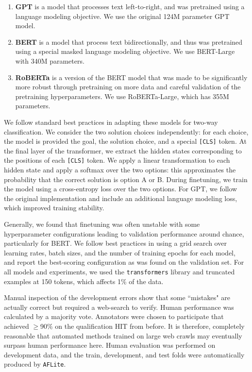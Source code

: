 \begin{enumerate}[wide, labelwidth=!,labelindent=0pt,noitemsep,topsep=0pt,label=\textbf{\alph*}.]
    \item {\bf GPT} \cite{Radford2018} is a model that processes text left-to-right, and was pretrained using a language modeling objective. We use the original 124M parameter GPT model.
    \item {\bf BERT} \cite{Devlin2018} is a model that process text bidirectionally, and thus was pretrained using a special masked language modeling objective. We use BERT-Large with 340M parameters.
    \item {\bf RoBERTa} \cite{Liu2019} is a version of the BERT model that was made to be significantly more robust through pretraining on more data and careful validation of the pretraining hyperparameters. We use RoBERTa-Large, which has 355M parameters.
\end{enumerate}

We follow standard best practices in adapting these models for two-way classification. We consider the two solution choices independently: for each choice, the model is provided the goal, the solution choice, and a special \texttt{[CLS]} token. At the final layer of the transformer, we extract the hidden states corresponding to the positions of each \texttt{[CLS]} token. We apply a linear transformation to each hidden state and apply a softmax over the two options: this approximates the probability that the correct solution is option A or B. During finetuning, we train the model using a cross-entropy loss over the two options. For GPT, we follow the original implementation and include an additional language modeling loss, which improved training stability.

Generally, we found that finetuning was often unstable with some hyperparameter configurations leading to validation performance around chance, particularly for BERT. We follow best practices in using a grid search over learning rates, batch sizes, and the number of training epochs for each model, and report the best-scoring configuration as was found on the validation set. For all models and experiments, we used the \texttt{transformers} 
library and truncated examples at 150 tokens, which affects 1\% of the data.

Manual inspection of the development errors show that some ``mistakes" are actually correct but required a web-search to verify. Human performance was calculated by a majority vote. Annotators were chosen to participate that achieved $\geq$90\% on the qualification HIT from before. It is therefore, completely reasonable that automated methods trained on large web crawls may eventually surpass human performance here. Human evaluation was performed on development data, and the train, development, and test folds were automatically produced by \texttt{AFLite}. 

